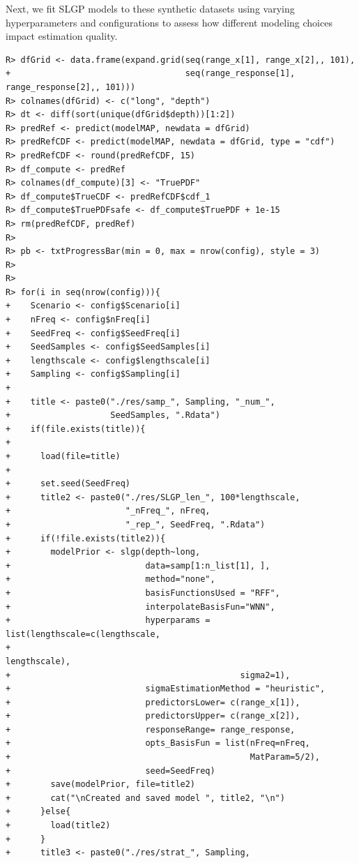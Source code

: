 \documentclass[
]{article}
\newcounter{none} %
\begin{document}
Next, we fit SLGP models to these synthetic datasets using varying hyperparameters and configurations to assess how different modeling choices impact estimation quality.

\begin{verbatim}
R> dfGrid <- data.frame(expand.grid(seq(range_x[1], range_x[2],, 101), 
+                                   seq(range_response[1], range_response[2],, 101)))
R> colnames(dfGrid) <- c("long", "depth")
R> dt <- diff(sort(unique(dfGrid$depth))[1:2])
R> predRef <- predict(modelMAP, newdata = dfGrid)
R> predRefCDF <- predict(modelMAP, newdata = dfGrid, type = "cdf")
R> predRefCDF <- round(predRefCDF, 15)
R> df_compute <- predRef
R> colnames(df_compute)[3] <- "TruePDF"
R> df_compute$TrueCDF <- predRefCDF$cdf_1
R> df_compute$TruePDFsafe <- df_compute$TruePDF + 1e-15
R> rm(predRefCDF, predRef)
R> 
R> pb <- txtProgressBar(min = 0, max = nrow(config), style = 3)
R> 
R> 
R> for(i in seq(nrow(config))){
+    Scenario <- config$Scenario[i]
+    nFreq <- config$nFreq[i]
+    SeedFreq <- config$SeedFreq[i]
+    SeedSamples <- config$SeedSamples[i]
+    lengthscale <- config$lengthscale[i]
+    Sampling <- config$Sampling[i]
+    
+    title <- paste0("./res/samp_", Sampling, "_num_",
+                    SeedSamples, ".Rdata")
+    if(file.exists(title)){
+      
+      load(file=title)
+      
+      set.seed(SeedFreq)
+      title2 <- paste0("./res/SLGP_len_", 100*lengthscale,
+                       "_nFreq_", nFreq,
+                       "_rep_", SeedFreq, ".Rdata")
+      if(!file.exists(title2)){
+        modelPrior <- slgp(depth~long, 
+                           data=samp[1:n_list[1], ],
+                           method="none", 
+                           basisFunctionsUsed = "RFF",
+                           interpolateBasisFun="WNN", 
+                           hyperparams = list(lengthscale=c(lengthscale,
+                                                            lengthscale), 
+                                              sigma2=1), 
+                           sigmaEstimationMethod = "heuristic", 
+                           predictorsLower= c(range_x[1]),
+                           predictorsUpper= c(range_x[2]),
+                           responseRange= range_response,
+                           opts_BasisFun = list(nFreq=nFreq,
+                                                MatParam=5/2),
+                           seed=SeedFreq)
+        save(modelPrior, file=title2)
+        cat("\nCreated and saved model ", title2, "\n")
+      }else{
+        load(title2)
+      }
+      title3 <- paste0("./res/strat_", Sampling,

\end{verbatim}
\end{document}
